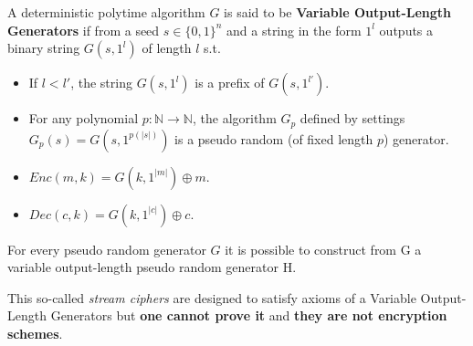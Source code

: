 \documentclass[../main]{subfiles}
\begin{document}
\begin{definition}
    A deterministic polytime algorithm $G$ is said to be \textbf{Variable Output-Length Generators} if from a seed $s \in{} \{0,1\}^n$ and a string in the form $1^l$ outputs a binary string $G(s,1^l)$ of length $l$ s.t.
    \begin{itemize}
        \item If $l < l'$, the string $G(s,1^l)$ is a prefix of $G(s,1^{l'})$.
        \item For any polynomial $p: \mathbb{N} \rightarrow{} \mathbb{N}$, the algorithm $G_p$ defined by settings $G_p(s)=G(s,1^{p(|s|)})$ is a pseudo random (of fixed length $p$) generator.
        \item $Enc(m,k) = G(k, 1^|m|) \oplus m$.
        \item $Dec(c,k) = G(k, 1^|c|) \oplus c$.
    \end{itemize}
\end{definition}

\begin{lemma}
    For every pseudo random generator $G$ it is possible to construct from G a variable output-length pseudo random generator H.
\end{lemma}
This so-called \textit{stream ciphers} are designed to satisfy axioms of a Variable Output-Length Generators but \textbf{one cannot prove it} and \textbf{they are not encryption schemes}.
\end{document}
